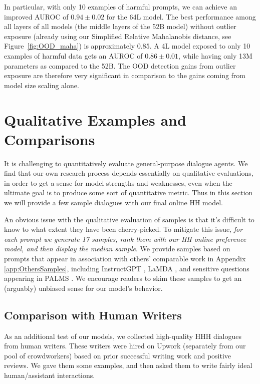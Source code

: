 In particular, with only 10 examples of harmful prompts, we can achieve an improved AUROC of $0.94 \pm 0.02$ for the 64L model. The best performance among all layers of all models (the middle layers of the 52B model) without outlier exposure (already using our Simplified Relative Mahalanobis distance, see Figure~\ref{fig:OOD_maha}) is approximately $0.85$. A 4L model exposed to only 10 examples of harmful data gets an AUROC of $0.86 \pm 0.01$, while having only 13M parameters as compared to the 52B. The OOD detection gains from outlier exposure are therefore very significant in comparison to the gains coming from model size scaling alone.

\section{Qualitative Examples and Comparisons}

It is challenging to quantitatively evaluate general-purpose dialogue agents.  We find that our own research process depends essentially on qualitative evaluations, in order to get a sense for model strengths and weaknesses, even when the ultimate goal is to produce some sort of quantitative metric.  Thus in this section we will provide a few sample dialogues with our final online HH model.

An obvious issue with the qualitative evaluation of samples is that it's difficult to know to what extent they have been cherry-picked.  To mitigate this issue, \emph{for each prompt we generate 17 samples, rank them with our HH online preference model, and then display the median sample}.  We  provide samples based on prompts that appear in association with others' comparable work in Appendix \ref{app:OthersSamples}, including InstructGPT \cite{InstructGPT}, LaMDA \cite{LaMDA}, and sensitive questions appearing in PALMS \cite{PALMS}.  We encourage readers to skim these samples to get an (arguably)  unbiased sense for our model's behavior.

\subsection{Comparison with Human Writers}
\label{sec:WriterComparison}

As an additional test of our models, we collected high-quality HHH dialogues from human writers.  These writers were hired on Upwork (separately from our pool of crowdworkers) based on prior successful writing work and positive reviews.  We gave them some examples, and then asked them to write fairly ideal human/assistant interactions.

